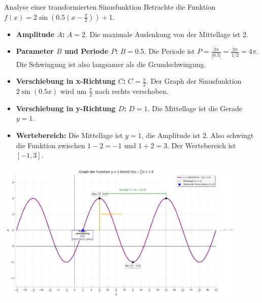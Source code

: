 \begin{beispielumgebung}{Analyse einer transformierten Sinusfunktion}
Betrachte die Funktion $f(x) = 2 \sin\left(0.5(x - \frac{\pi}{2})\right) + 1$.
\begin{itemize}
    \item \textbf{Amplitude $A$:} $A=2$. Die maximale Auslenkung von der Mittellage ist 2.
    \item \textbf{Parameter $B$ und Periode $P$:} $B=0.5$. Die Periode ist $P = \frac{2\pi}{|0.5|} = \frac{2\pi}{1/2} = 4\pi$. Die Schwingung ist also langsamer als die Grundschwingung.
    \item \textbf{Verschiebung in x-Richtung $C$:} $C=\frac{\pi}{2}$. Der Graph der Sinusfunktion $2\sin(0.5x)$ wird um $\frac{\pi}{2}$ nach rechts verschoben.
    \item \textbf{Verschiebung in y-Richtung $D$:} $D=1$. Die Mittellage ist die Gerade $y=1$.
    \item \textbf{Wertebereich:} Die Mittellage ist $y=1$, die Amplitude ist $2$. Also schwingt die Funktion zwischen $1-2=-1$ und $1+2=3$. Der Wertebereich ist $[-1, 3]$.
\end{itemize}
\begin{center}
    \includegraphics[width=0.9\textwidth]{grafiken/Trig_Trafo_Sinus.png}
    \label{fig:trafo_sin}
\end{center}
\end{beispielumgebung}

